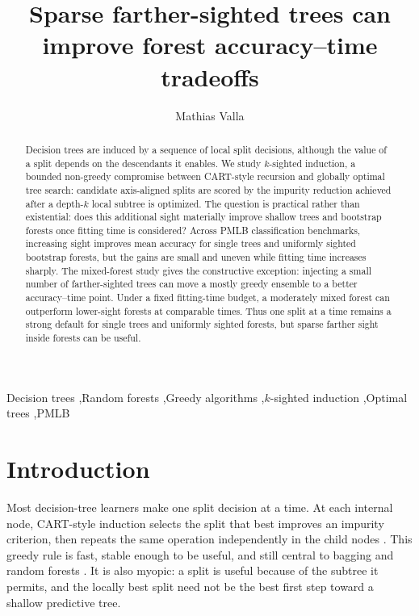 \documentclass[final,5p,times]{elsarticle}
\begin{document}
\begin{frontmatter}

\title{Sparse farther-sighted trees can improve forest accuracy--time tradeoffs}

\author[1]{Mathias Valla}

\begin{abstract}
Decision trees are induced by a sequence of local split decisions, although the value of a split depends on the descendants it enables. We study $k$-sighted induction, a bounded non-greedy compromise between CART-style recursion and globally optimal tree search: candidate axis-aligned splits are scored by the impurity reduction achieved after a depth-$k$ local subtree is optimized. The question is practical rather than existential: does this additional sight materially improve shallow trees and bootstrap forests once fitting time is considered? Across PMLB classification benchmarks, increasing sight improves mean accuracy for single trees and uniformly sighted bootstrap forests, but the gains are small and uneven while fitting time increases sharply. The mixed-forest study gives the constructive exception: injecting a small number of farther-sighted trees can move a mostly greedy ensemble to a better accuracy--time point. Under a fixed fitting-time budget, a moderately mixed forest can outperform lower-sight forests at comparable times. Thus one split at a time remains a strong default for single trees and uniformly sighted forests, but sparse farther sight inside forests can be useful.
\end{abstract}

\begin{keyword}
Decision trees \sep Random forests \sep Greedy algorithms \sep $k$-sighted induction \sep Optimal trees \sep PMLB
\end{keyword}

\end{frontmatter}

\section{Introduction}

Most decision-tree learners make one split decision at a time. At each internal node, CART-style induction selects the split that best improves an impurity criterion, then repeats the same operation independently in the child nodes \cite{breiman1984cart,quinlan1986induction}. This greedy rule is fast, stable enough to be useful, and still central to bagging and random forests \cite{breiman1996bagging,breiman2001random}. It is also myopic: a split is useful because of the subtree it permits, and the locally best split need not be the best first step toward a shallow predictive tree.
\end{document}

